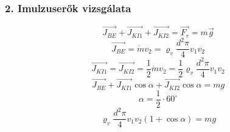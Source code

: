 \subsubsection*{2. Imulzuserők vizsgálata}
\begin{equation}
	\vec{J_{BE}} + \vec{J_{KI1}} + \vec{J_{KI2}} = \vec{F_r} = m \vec{g}
\end{equation}
\begin{equation}
\vec{J_{BE}} = \dot{m} v_2 = \varrho_v \frac{d^2 \pi}{4} v_1 v_2
\end{equation}
\begin{equation}
\vec{J_{KI1}} = \vec{J_{KI2}} = \frac{1}{2} \dot{m} v_2 = \frac{1}{2} \varrho_v \frac{d^2 \pi}{4} v_1 v_2
\end{equation}
\begin{equation}
\vec{J_{BE}} + \vec{J_{KI1}} \cos\alpha + \vec{J_{KI2}} \cos\alpha = mg  
\end{equation}
\begin{equation}
\alpha = \frac{1}{2} \cdot 60^\circ
\end{equation}
\begin{equation}
\varrho_v \frac{d^2 \pi}{4} v_1 v_2 (1+\cos\alpha) = m g 
\end{equation}

